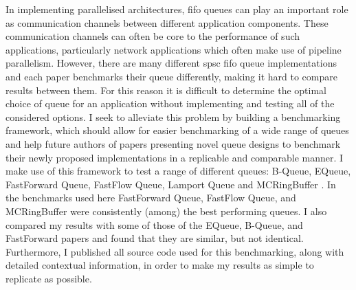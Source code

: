 \null\vfil
\begin{center}\textsf{\textbf{\abstractname}}\end{center}

\noindent In implementing parallelised architectures, \acrfull{fifo} queues can play an important role as
communication channels between different application components\cite{WangCheng2009}.
These communication channels can often be core to the performance of such applications, particularly network
applications which often make use of pipeline parallelism\cite{Upadhyaya2007,WangCheng2009}.
However, there are many different \acrfull{spsc} \acrshort{fifo} queue implementations and each paper
benchmarks their queue differently, making it hard to compare results between them.
For this reason it is difficult to determine the optimal choice of queue for an application without
implementing and testing all of the considered options.
I seek to alleviate this problem by building a benchmarking framework, which should allow for easier
benchmarking of a wide range of queues and help future authors of papers presenting novel queue designs to
benchmark their newly proposed implementations in a replicable and comparable manner.
I make use of this framework to test a range of different queues: B-Queue, EQueue, FastForward Queue,
FastFlow Queue, Lamport Queue and MCRingBuffer \cite{B-Queue,EQueue,FastForward,FastFlowGithub,Lamport,MCRingBuffer}.
In the benchmarks used here FastForward Queue, FastFlow Queue, and MCRingBuffer were consistently (among) the
best performing queues.
I also compared my results with some of those of the EQueue, B-Queue, and FastForward papers and found that
they are similar, but not identical.
Furthermore, I published all source code used for this benchmarking, along with detailed contextual
information, in order to make my results as simple to replicate as possible.

\vfil\null
